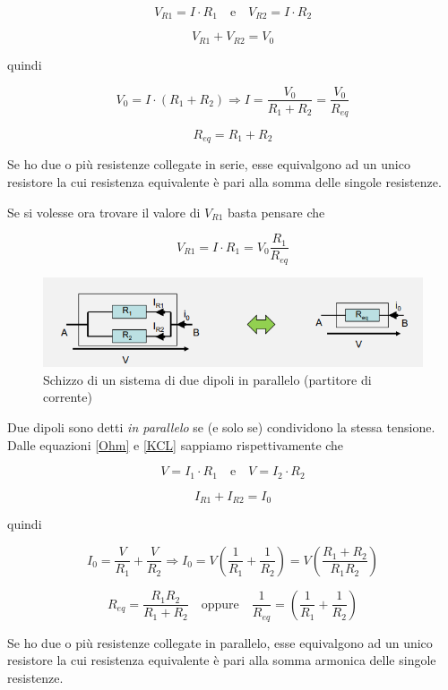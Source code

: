 \documentclass{article}
\begin{document}
\[V_{R1} = I \cdot R_1 \quad \textrm{e} \quad V_{R2} = I \cdot R_2\]

\[V_{R1} + V_{R2} = V_0\]

quindi

\[V_0 = I \cdot (R_1 + R_2) \Rightarrow I = \frac{V_0}{R_1 + R_2} = \frac{V_0}{R_{eq}}\]

\[R_{eq} = R_1 + R_2\]

Se ho due o più resistenze collegate in serie, esse equivalgono ad un unico resistore la cui resistenza equivalente è pari alla somma delle singole resistenze.

\vspace{3mm}

Se si volesse ora trovare il valore di $V_{R1}$ basta pensare che

\[V_{R1} = I \cdot R_1 = V_0 \frac{R_1}{R_{eq}}\]

\begin{figure}[h]
  \centering
  \includegraphics[scale=0.7]{IM_circuiti_partitori_bis}
  \caption{Schizzo di un sistema di due dipoli in parallelo (partitore di corrente)}
  \label{Schema_dipoli_parallelo}
\end{figure}

Due dipoli sono detti \textit{in parallelo} se (e solo se) condividono la stessa tensione. Dalle equazioni \ref{Ohm} e \ref{KCL} sappiamo rispettivamente che

\[V = I_1 \cdot R_1 \quad \textrm{e} \quad V = I_2 \cdot R_2\]

\[I_{R1} + I_{R2} = I_0\]

quindi

\[I_0 =\frac{V}{R_1} + \frac{V}{R_2} \Rightarrow I_0 = V \left( \frac{1}{R_1}+ \frac{1}{R_2} \right) = V \left( \frac{R_1 + R_2}{R_1 R_2} \right)\]

\[R_{eq} = \frac{R_1 R_2}{R_1 + R_2} \quad \textrm{oppure} \quad \frac{1}{R_{eq}}=\left( \frac{1}{R_1}+ \frac{1}{R_2} \right)\]

Se ho due o più resistenze collegate in parallelo, esse equivalgono ad un unico resistore la cui resistenza equivalente è pari alla somma armonica delle singole resistenze.
\end{document}
